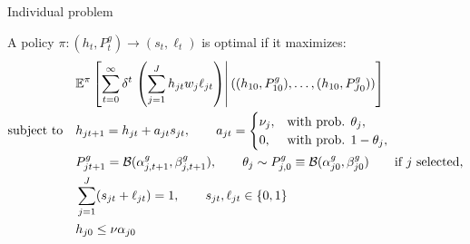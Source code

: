 
\begin{frame}{Individual problem}


A policy $\pi: (h_t, P_t^g) \to (s_t, \ell_t)$ is optimal if it maximizes:
\begin{align*}
& \mathbb{E}^\pi \left[ 
   \sum_{t=0}^\infty \delta^t 
   \left. \left( \sum_{j=1}^J h_{jt} w_j \ell_{jt}  \right) \right\vert
   \left( (h_{10}, P_{10}^g), \dots, (h_{10}, P_{J0}^g) \right)
 \right] \\
\text{subject to} \quad& h_{jt+1} = h_{jt}+ a_{jt} s_{jt}, \quad \quad a_{jt} = 
   \begin{cases} 
      \nu_j, & \text{with prob. } \theta_j,  \\ 
      0, & \text{with prob. } 1 - \theta_j,
   \end{cases} 
   \\
\quad& P_{jt+1}^g = 
  \mathcal{B} (\alpha_{j,t+1}^g, \beta_{j,t+1}^g), 
  \quad \quad \theta_j \sim P_{j,0}^g \equiv \mathcal{B} (\alpha_{j0}^g, \beta_{j0}^g)
  \quad \quad \text{if $j$ selected,} \\
\quad& \sum_{j=1}^J (s_{jt} + \ell_{jt}) = 1, \quad \quad s_{jt}, \ell_{jt} \in \{0,1\} \\
   & h_{j0} \leq \nu \alpha_{j0}
\end{align*}

\end{frame}

